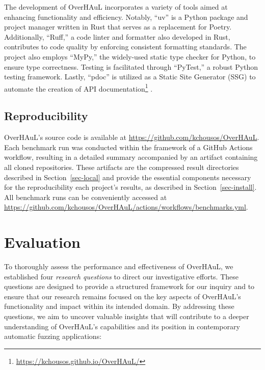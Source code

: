 \documentclass[
  a4paper,
]{scrreprt}
\theoremstyle{definition}
\theoremstyle{remark}
\begin{document}
The development of OverHAuL incorporates a variety of tools aimed at
enhancing functionality and efficiency. Notably, ``uv'' is a Python
package and project manager written in Rust that serves as a replacement
for Poetry. Additionally, ``Ruff,'' a code linter and formatter also
developed in Rust, contributes to code quality by enforcing consistent
formatting standards. The project also employs ``MyPy,'' the widely-used
static type checker for Python, to ensure type correctness. Testing is
facilitated through ``PyTest,'' a robust Python testing framework.
Lastly, ``pdoc'' is utilized as a Static Site Generator (SSG) to
automate the creation of API documentation\footnote{\url{https://kchousos.github.io/OverHAuL/}}
\autocite{astral2025,astral2025a,cortesi2025,pytestdevteam2025,pythonsoftwarefoundation2025}.

\section{Reproducibility}\label{reproducibility}

OverHAuL's source code is available at
\url{https://github.com/kchousos/OverHAuL}. Each benchmark run was
conducted within the framework of a GitHub Actions workflow, resulting
in a detailed summary accompanied by an artifact containing all cloned
repositories. These artifacts are the compressed result directories
described in Section~\ref{sec-local} and provide the essential
components necessary for the reproducibility each project's results, as
described in Section~\ref{sec-install}. All benchmark runs can be
conveniently accessed at
\url{https://github.com/kchousos/OverHAuL/actions/workflows/benchmarks.yml}.


\chapter{Evaluation}\label{sec-eval}

To thoroughly assess the performance and effectiveness of OverHAuL, we
established four \emph{research questions} to direct our investigative
efforts. These questions are designed to provide a structured framework
for our inquiry and to ensure that our research remains focused on the
key aspects of OverHAuL's functionality and impact within its intended
domain. By addressing these questions, we aim to uncover valuable
insights that will contribute to a deeper understanding of OverHAuL's
capabilities and its position in contemporary automatic fuzzing
applications:
\end{document}
